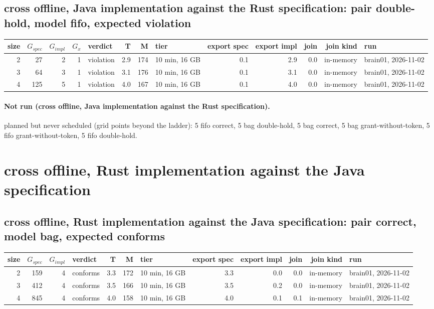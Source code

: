 \documentclass[10pt]{article}
\begin{document}
\subsection*{cross offline, Java implementation against the Rust specification: pair \textsf{double-hold}, model fifo, expected violation}
\begin{longtable}{@{}rrrrlrrlrrrrl@{}}
\toprule
size & $G_{\mathit{spec}}$ & $G_{\mathit{impl}}$ & $G_x$ & verdict & T & M & tier & export spec & export impl & join & join kind & run \\
\midrule
\endhead
\color{red} 2 & 27 & 2 & 1 & violation & 2.9 & 174 & 10 min, 16 GB & 0.1 & 2.9 & 0.0 & in-memory & brain01, 2026-11-02 \\
\color{red} 3 & 64 & 3 & 1 & violation & 3.1 & 176 & 10 min, 16 GB & 0.1 & 3.1 & 0.0 & in-memory & brain01, 2026-11-02 \\
\color{red} 4 & 125 & 5 & 1 & violation & 4.0 & 167 & 10 min, 16 GB & 0.1 & 4.0 & 0.0 & in-memory & brain01, 2026-11-02 \\
\bottomrule
\end{longtable}
\paragraph{Not run (cross offline, Java implementation against the Rust specification).}
planned but never scheduled (grid points beyond the ladder): 5 fifo correct, 5 bag double-hold, 5 bag correct, 5 bag grant-without-token, 5 fifo grant-without-token, 5 fifo double-hold.\par
\section*{cross offline, Rust implementation against the Java specification}
\subsection*{cross offline, Rust implementation against the Java specification: pair \textsf{correct}, model bag, expected conforms}
\begin{longtable}{@{}rrrlrrlrrrrl@{}}
\toprule
size & $G_{\mathit{spec}}$ & $G_{\mathit{impl}}$ & verdict & T & M & tier & export spec & export impl & join & join kind & run \\
\midrule
\endhead
\color{red} 2 & 159 & 4 & conforms & 3.3 & 172 & 10 min, 16 GB & 3.3 & 0.0 & 0.0 & in-memory & brain01, 2026-11-02 \\
\color{red} 3 & 412 & 4 & conforms & 3.5 & 166 & 10 min, 16 GB & 3.5 & 0.2 & 0.0 & in-memory & brain01, 2026-11-02 \\
\color{red} 4 & 845 & 4 & conforms & 4.0 & 158 & 10 min, 16 GB & 4.0 & 0.1 & 0.1 & in-memory & brain01, 2026-11-02 \\
\bottomrule
\end{longtable}
\end{document}
